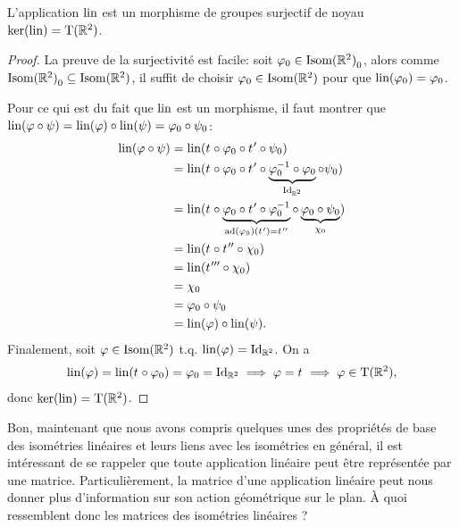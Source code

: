 \documentclass{book}
\numberwithin{equation}{section}
\renewcommand{\phi}{\varphi}
\providecommand{\plan}{{\mathbb R^2}}
\providecommand{\id}{{\textnormal{Id}}}
\providecommand{\idR}{{\id_\plan}}
\providecommand{\transR}{{\textnormal{T}(\plan)}}
\providecommand{\isom}{{\textnormal{Isom}(\plan)}}
\providecommand{\isomo}{{\isom_0}}
\providecommand{\ker}{{\textnormal{ker}}}
\providecommand{\trans}[1]{{t_{#1}}}
\providecommand{\lin}{{\textnormal{lin}}}
\providecommand{\ad}{{\textnormal{ad}}}
\begin{document}
\begin{thm}
	L'application $\lin$ est un morphisme de groupes surjectif de noyau $\ker(\lin) = \transR$.
\end{thm}
\begin{proof}
	La preuve de la surjectivité est facile: soit $\phi_0 \in \isomo$, alors comme $\isomo \subseteq \isom$, il suffit de choisir $\phi_0 \in \isom$ pour que $\lin(\phi_0) = \phi_0$.\par
	Pour ce qui est du fait que $\lin$ est un morphisme, il faut montrer que $\lin(\phi \circ \psi) = \lin(\phi) \circ \lin(\psi) = \phi_0 \circ \psi_0$:
	\begin{align*}
		\lin(\phi \circ \psi) &= \lin(\trans{} \circ \phi_0 \circ \trans{}' \circ \psi_0)\\
		&= \lin(\trans{} \circ \phi_0 \circ \trans{}' \circ \underbrace{\phi_0^{-1} \circ \phi_0}_{\idR} \circ \psi_0)\\
		&= \lin(\trans{} \circ \underbrace{\phi_0 \circ \trans{}' \circ \phi_0^{-1}}_{\ad(\phi_9)(\trans{}') = \trans{}''} \circ \underbrace{\phi_0 \circ \psi_0}_{\chi_0})\\
		&= \lin(\trans{} \circ \trans{}'' \circ \chi_0)\\
		&= \lin(\trans{}''' \circ \chi_0)\\
		&= \chi_0\\
		&= \phi_0 \circ \psi_0\\
		&= \lin(\phi) \circ \lin(\psi).
	\end{align*}
	Finalement, soit $\phi \in \isom$ t.q. $\lin(\phi) = \idR$. On a
	\begin{align*}
		\lin(\phi) = \lin(\trans{} \circ \phi_0) = \phi_0 = \idR \implies \phi = \trans{} \implies \phi \in \transR,
	\end{align*}
	donc $\ker(\lin) = \transR$.
\end{proof}

Bon, maintenant que nous avons compris quelques unes des propriétés de base des isométries linéaires et leurs liens avec les isométries en général, il est intéressant de se rappeler que toute application linéaire peut être représentée par une matrice. Particulièrement, la matrice d'une application linéaire peut nous donner plus d'information sur son action géométrique sur le plan. À quoi ressemblent donc les matrices des isométries linéaires ?
\end{document}
